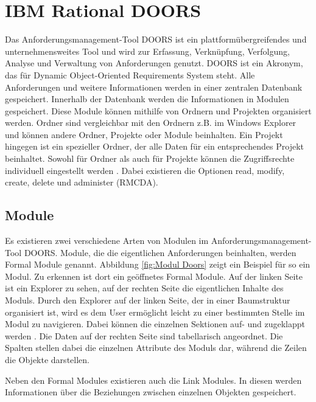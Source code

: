 \section{IBM Rational DOORS}
\label{chap:DOORS}

Das Anforderungsmanagement-Tool \ac{DOORS} ist ein plattformübergreifendes und unternehmensweites Tool und wird
zur Erfassung, Verknüpfung, Verfolgung, Analyse und Verwaltung von Anforderungen genutzt. \ac{DOORS} ist ein Akronym,
das für Dynamic Object-Oriented Requirements System steht. Alle Anforderungen und weitere Informationen werden in einer zentralen Datenbank
gespeichert. Innerhalb der Datenbank werden die Informationen in Modulen gespeichert. Diese Module können mithilfe von Ordnern und Projekten
organisiert werden. Ordner sind vergleichbar mit den Ordnern z.B. im Windows Explorer und können andere Ordner, Projekte oder Module
beinhalten. Ein Projekt hingegen ist ein spezieller Ordner, der alle Daten für ein entsprechendes Projekt beinhaltet. Sowohl für 
Ordner als auch für Projekte können die Zugriffsrechte individuell eingestellt werden \cite[vgl. S.173]{DOORS}. Dabei existieren die Optionen
read, modify, create, delete und administer (RMCDA). 

\subsection{Module}
Es existieren zwei verschiedene Arten von Modulen im Anforderungsmanagement-Tool \ac{DOORS}. Module, die die eigentlichen Anforderungen
beinhalten, werden Formal Module genannt. Abbildung \ref*{fig:Modul Doors} zeigt ein Beispiel für so ein Modul. Zu erkennen ist dort
ein geöffnetes Formal Module. Auf der linken Seite ist ein Explorer zu sehen, auf der rechten Seite die eigentlichen Inhalte des Moduls.
Durch den Explorer auf der linken Seite, der in einer Baumstruktur organisiert ist, wird es dem User ermöglicht leicht zu einer bestimmten
Stelle im Modul zu navigieren. Dabei können die einzelnen Sektionen auf- und zugeklappt werden \cite[vgl. S.176]{DOORS}. Die Daten auf der 
rechten Seite sind tabellarisch angeordnet. Die Spalten stellen dabei die einzelnen Attribute des Moduls dar, während die Zeilen die 
Objekte darstellen. 

Neben den Formal Modules existieren auch die Link Modules. In diesen werden Informationen über die Beziehungen zwischen einzelnen Objekten
gespeichert.

